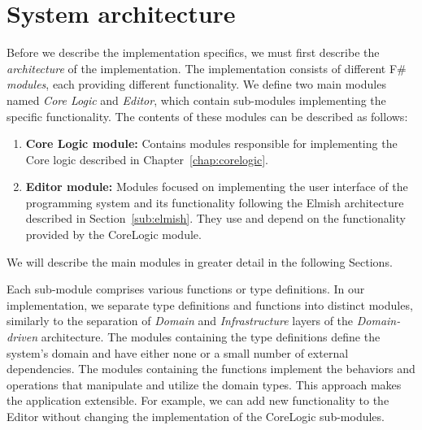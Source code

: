 \section{System architecture}
\label{sec:appArch}
Before we describe the implementation specifics, we must first describe the \emph{architecture} of the implementation.
The implementation consists of different F\# \emph{modules}, each providing different functionality.
We define two main modules named \emph{Core Logic} and \emph{Editor}, which contain sub-modules implementing the specific functionality.
The contents of these modules can be described as follows:
\begin{enumerate}
	\item \textbf{Core Logic module:} Contains modules responsible for implementing the Core logic described in Chapter~\ref{chap:corelogic}.
	\item \textbf{Editor module:} Modules focused on implementing the user interface of the programming system and its functionality following the Elmish architecture described in Section~\ref{sub:elmish}.
	      They use and depend on the functionality provided by the CoreLogic module.
\end{enumerate}
We will describe the main modules in greater detail in the following Sections.

Each sub-module comprises various functions or type definitions.
In our implementation, we separate type definitions and functions into distinct modules, similarly to the separation of \emph{Domain} and \emph{Infrastructure} layers of the \emph{Domain-driven} architecture.
The modules containing the type definitions define the system's domain and have either none or a small number of external dependencies.
The modules containing the functions implement the behaviors and operations that manipulate and utilize the domain types.
This approach makes the application extensible.
For example, we can add new functionality to the Editor without changing the implementation of the CoreLogic sub-modules.


